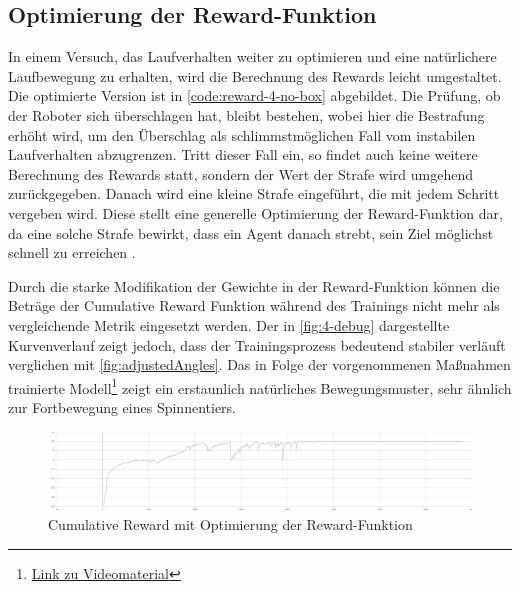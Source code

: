 \subsection{Optimierung der Reward-Funktion}
In einem Versuch, das Laufverhalten weiter zu optimieren und eine natürlichere Laufbewegung zu erhalten, wird die Berechnung des Rewards leicht umgestaltet.
Die optimierte Version ist in \autoref{code:reward-4-no-box} abgebildet.
Die Prüfung, ob der Roboter sich überschlagen hat, bleibt bestehen, wobei hier die Bestrafung erhöht wird, um den Überschlag als schlimmstmöglichen Fall vom instabilen Laufverhalten abzugrenzen.
Tritt dieser Fall ein, so findet auch keine weitere Berechnung des Rewards statt, sondern der Wert der Strafe wird umgehend zurückgegeben.
Danach wird eine kleine Strafe eingeführt, die mit jedem Schritt vergeben wird.
Diese stellt eine generelle Optimierung der Reward-Funktion dar, da eine solche Strafe bewirkt, dass ein Agent danach strebt, sein Ziel möglichst schnell zu erreichen \cite{mlagentsReward}.

Durch die starke Modifikation der Gewichte in der Reward-Funktion können die Beträge der Cumulative Reward Funktion während des Trainings nicht mehr als vergleichende Metrik eingesetzt werden.
Der in \autoref{fig:4-debug} dargestellte Kurvenverlauf zeigt jedoch, dass der Trainingsprozess bedeutend stabiler verläuft verglichen mit \autoref{fig:adjustedAngles}.
Das in Folge der vorgenommenen Maßnahmen trainierte Modell\footnote{\href{https://github.com/yschiebelhut/studienarbeit-doc/raw/master/Videos/SpiderBotDemos/4-debug-extended-vector-size.webm}{Link zu Videomaterial}} zeigt ein erstaunlich natürliches Bewegungsmuster, sehr ähnlich zur Fortbewegung eines Spinnentiers.

\begin{figure}
    
\end{figure}


\begin{figure}
    \centering
    \includegraphics[width=\textwidth]{Bilder/ml-agents/Environment_Cumulative Reward-4-debug-extended-vector-space.pdf}
    \caption{Cumulative Reward mit Optimierung der Reward-Funktion}
    \label{fig:4-debug}
\end{figure}


